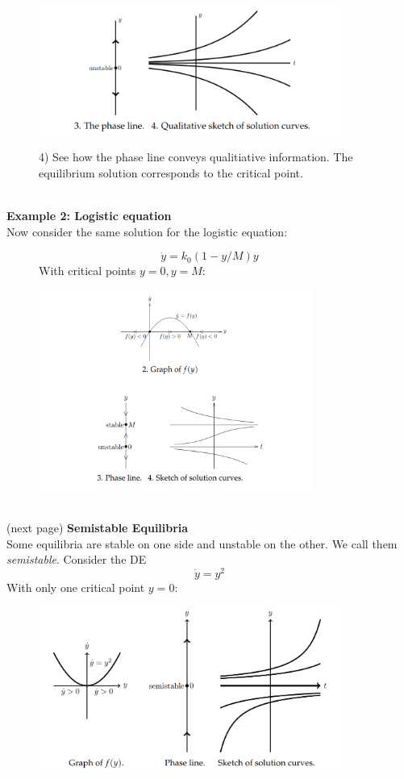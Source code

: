 \documentclass{report}
\begin{document}
\begin{figure}[h]
\begin{center}
\includegraphics[width=10cm]{18}\\
\end{center}
4) See how the phase line conveys qualitiative information. The equilibrium solution corresponds to the critical
point.
\end{figure}\\
\textbf{Example 2: Logistic equation}\\
Now consider the same solution for the logistic equation:
\begin{figure}[h]
\begin{equation*}
\dot{y}=k_0(1-y/M)y
\end{equation*}
With critical points $y=0,y=M$:
\begin{center}
\includegraphics[width=9cm]{19}\\
\end{center}
\end{figure}\\
(next page)
\newpage
\noindent\textbf{Semistable Equilibria}\\
Some equilibria are stable on one side and unstable on the other. We call them \textit{semistable}. 
Consider the DE
\begin{equation*}
\dot{y}=y^2
\end{equation*}
With only one critical point $y=0$:
\begin{figure}[h]
\begin{center}
\includegraphics[width=10cm]{20}\\
\end{center}
\end{figure}
\end{document}
